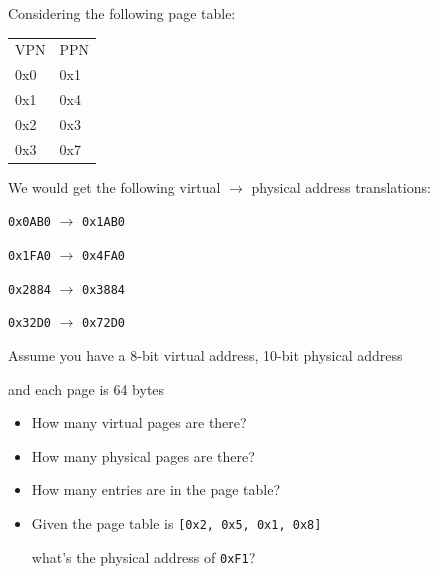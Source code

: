 \begin{slide}


    Considering the following page table:
    \begin{center}
    {\ttfamily
    \begin{tabular}{ll}
      VPN  & PPN  \\
      0x0 & 0x1 \\
      0x1 & 0x4 \\
      0x2 & 0x3 \\
      0x3 & 0x7 \\
    \end{tabular}}
    \end{center}
    \medskip

    We would get the following virtual $\rightarrow$ physical address translations:
    \begin{center}
    \texttt{0x0AB0} $\rightarrow$ \texttt{0x1AB0}

    \texttt{0x1FA0} $\rightarrow$ \texttt{0x4FA0}

    \texttt{0x2884} $\rightarrow$ \texttt{0x3884}

    \texttt{0x32D0} $\rightarrow$ \texttt{0x72D0}
    \end{center}

\end{slide}

\begin{slide}


    Assume you have a 8-bit virtual address, 10-bit physical address

    \leftspace{}and each page is 64 bytes
    \medskip

    \begin{itemize}
      \item How many virtual pages are there? 
      \item How many physical pages are there? 
      \item How many entries are in the page table? 
      \item Given the page table is \texttt{{[0x2, 0x5, 0x1, 0x8]}}

            \hspace{2em} what's the physical address of \texttt{0xF1}?

    \end{itemize}

\end{slide}

